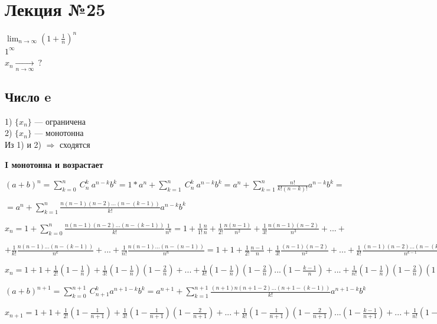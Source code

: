 \documentclass{article}
\begin{document}
\section{Лекция №25}

\(\lim_{n \rightarrow \infty}{(1 + \frac{1}{n})^n}\)
\\ \(1^{\infty}\)
\\ \( x_n \xrightarrow[n \rightarrow \infty ]{}\ ? \)

\subsection{Число e}
1) \( \{ x_n \} \) --- ограничена \\
2) \( \{ x_n \} \) --- монотонна \\
Из 1) и 2) \( \Rightarrow \) сходятся

\textbf{I монотонна и возрастает}

\((a+b)^n = \sum_{k=0}^n\ C^k_n \ a^{n-k}b^k=1*a^n+\sum_{k=1}^n\ C^k_n \ a^{n-k}b^k = a^n+\sum_{k=1}^n \frac{n!}{k!(n-k)!} a^{n-k}b^k = \)

\( = a^n + \sum_{k=1}^n \frac{n(n-1)(n-2)...(n-(k-1))}{k!} a^{n-k} b^k\)

\( x_n = 1 + \sum_{k=0}^n \frac{n(n-1)(n-2)...(n-(k-1))}{k!} \frac{1}{n^k} = 1 + \frac{1}{1!} \frac{n}{n} + \frac{1}{2!} \frac{n(n-1)}{n^2} + \frac{1}{3!} \frac{n(n-1)(n-2)}{n^3} + ... + \)

\( + \frac{1}{k!} \frac{n(n-1)...(n-(k-1))}{n^k} + ... + \frac{1}{n!} \frac{n(n-1)...(n-(n-1))}{n^n} = 1 + 1 + \frac{1}{2!} \frac{n-1}{n} + \frac{1}{3!} \frac{(n-1)(n-2)}{n^2} + ... + \frac{1}{k!} \frac{(n-1)(n-2)...(n-(k-1))}{n^{k-1}} + ... +\)

\(x_n = 1+1+\frac{1}{2!}(1-\frac{1}{n})+\frac{1}{3!}(1-\frac{1}{n})(1-\frac{2}{n})+...+\frac{1}{k!}(1-\frac{1}{n})(1-\frac{2}{n})...(1-\frac{k-1}{n}) + ... + \frac{1}{n!} (1 - \frac{1}{n})(1 - \frac{2}{n})(1 - \frac{n-1}{n})\)

\((a+b)^{n+1} = \sum_{k=0}^{n+1}\ C_{n+1}^k a^{n+1-k} b^k = a^{n+1} + \sum_{k=1}^{n+1} \frac{(n+1)n(n+1-2)...(n+1-(k-1))}{k!} a^{n+1-k} b^k\)

\(x_{n+1} = 1 + 1 + \frac{1}{2!}(1-\frac{1}{n+1}) + \frac{1}{3!}(1-\frac{1}{n+1})(1-\frac{2}{n+1})+...+\frac{1}{k!}(1-\frac{1}{n+1})(1-\frac{2}{n+1})...(1-\frac{k-1}{n+1})+...+\frac{1}{n!}(1-\frac{1}{n+1})(1-\frac{2}{n+1})...(1-\frac{n-1}{n+1}) + \underbrace{\frac{1}{(n+1)!}(1-\frac{1}{n+1})(1-\frac{2}{n+1})...(1-\frac{n}{n+1})}_{> 0} \Rightarrow TODO \)
\end{document}
